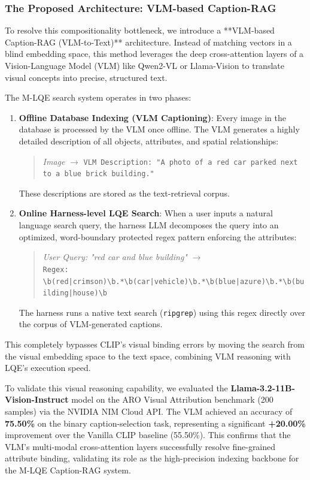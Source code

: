 \documentclass[11pt,a4paper]{article}
\begin{document}
\subsubsection{The Proposed Architecture: VLM-based Caption-RAG}
To resolve this compositionality bottleneck, we introduce a **VLM-based Caption-RAG (VLM-to-Text)** architecture. Instead of matching vectors in a blind embedding space, this method leverages the deep cross-attention layers of a Vision-Language Model (VLM) like Qwen2-VL or Llama-Vision to translate visual concepts into precise, structured text.

The M-LQE search system operates in two phases:

\begin{enumerate}
    \item \textbf{Offline Database Indexing (VLM Captioning)}:
    Every image in the database is processed by the VLM once offline. The VLM generates a highly detailed description of all objects, attributes, and spatial relationships:
    \begin{quote}
        \textit{Image} $\rightarrow$ \texttt{VLM Description: "A photo of a red car parked next to a blue brick building."}
    \end{quote}
    These descriptions are stored as the text-retrieval corpus.
    
    \item \textbf{Online Harness-level LQE Search}:
    When a user inputs a natural language search query, the harness LLM decomposes the query into an optimized, word-boundary protected regex pattern enforcing the attributes:
    \begin{quote}
        \textit{User Query: "red car and blue building"} $\rightarrow$ \\
        \texttt{Regex: \textbackslash b(red|crimson)\textbackslash b.*\textbackslash b(car|vehicle)\textbackslash b.*\textbackslash b(blue|azure)\textbackslash b.*\textbackslash b(building|house)\textbackslash b}
    \end{quote}
    The harness runs a native text search (\texttt{ripgrep}) using this regex directly over the corpus of VLM-generated captions.
\end{enumerate}

This completely bypasses CLIP's visual binding errors by moving the search from the visual embedding space to the text space, combining VLM reasoning with LQE's execution speed.

To validate this visual reasoning capability, we evaluated the \textbf{Llama-3.2-11B-Vision-Instruct} model on the ARO Visual Attribution benchmark (200 samples) via the NVIDIA NIM Cloud API. The VLM achieved an accuracy of \textbf{75.50\%} on the binary caption-selection task, representing a significant \textbf{+20.00\%} improvement over the Vanilla CLIP baseline (55.50\%). This confirms that the VLM's multi-modal cross-attention layers successfully resolve fine-grained attribute binding, validating its role as the high-precision indexing backbone for the M-LQE Caption-RAG system.
\end{document}
